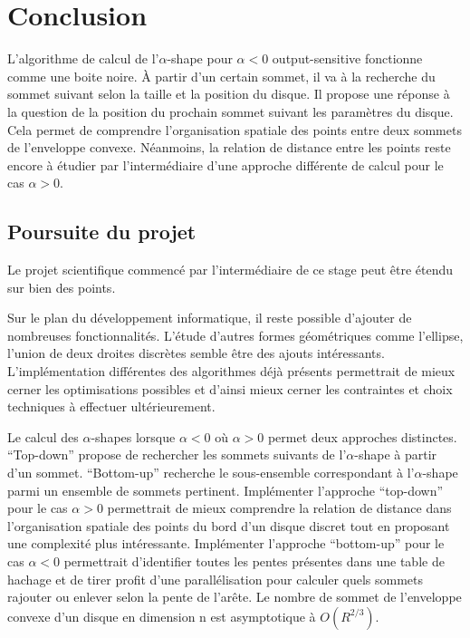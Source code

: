 \section{Conclusion}


L'algorithme de calcul de l'$\alpha$-shape pour $\alpha < 0$ output-sensitive fonctionne comme une boite noire. À partir d'un certain sommet, il va à la recherche du sommet suivant selon la taille et la position du disque. Il propose une réponse à la question de la position du prochain sommet suivant les paramètres du disque. Cela permet de comprendre l'organisation spatiale des points entre deux sommets de l'enveloppe convexe. Néanmoins, la relation de distance entre les points reste encore à étudier par l'intermédiaire d'une approche différente de calcul pour le cas $\alpha > 0$.


\subsection{Poursuite du projet}

Le projet scientifique commencé par l'intermédiaire de ce stage peut être étendu sur bien des points. 

Sur le plan du développement informatique, il reste possible d'ajouter de nombreuses fonctionnalités. L’étude d'autres formes géométriques comme l'ellipse, l'union de deux droites discrètes semble être des ajouts intéressants. L'implémentation différentes des algorithmes déjà présents permettrait de mieux cerner les optimisations possibles et d'ainsi mieux cerner les contraintes et choix techniques à effectuer ultérieurement. 

Le calcul des $\alpha$-shapes lorsque $\alpha < 0$ où $\alpha > 0$ permet deux approches distinctes. ``Top-down'' propose de rechercher les sommets suivants de l'$\alpha$-shape à partir d'un sommet. ``Bottom-up'' recherche le sous-ensemble correspondant à l'$\alpha$-shape parmi un ensemble de sommets pertinent. Implémenter l'approche ``top-down'' pour le cas $\alpha > 0$ permettrait de mieux comprendre la relation de distance dans l'organisation spatiale des points du bord d'un disque discret tout en proposant une complexité plus intéressante. Implémenter l'approche ``bottom-up'' pour le cas $\alpha < 0$ permettrait d'identifier toutes les pentes présentes dans une table de hachage et de tirer profit d'une parallélisation pour calculer quels sommets rajouter ou enlever selon la pente de l'arête. Le nombre de sommet de l'enveloppe convexe d'un disque en dimension n est asymptotique à $O(R^{2/3})$. 

